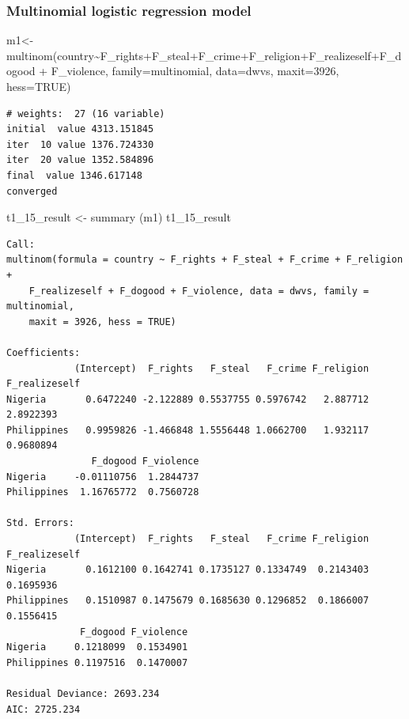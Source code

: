 \documentclass[
  11pt,
]{article}
\newenvironment{Shaded}{\begin{snugshade}}{\end{snugshade}}
\newcommand{\AttributeTok}[1]{\textcolor[rgb]{0.77,0.63,0.00}{#1}}
\newcommand{\ConstantTok}[1]{\textcolor[rgb]{0.00,0.00,0.00}{#1}}
\newcommand{\DecValTok}[1]{\textcolor[rgb]{0.00,0.00,0.81}{#1}}
\newcommand{\FunctionTok}[1]{\textcolor[rgb]{0.00,0.00,0.00}{#1}}
\newcommand{\NormalTok}[1]{#1}
\newcommand{\OtherTok}[1]{\textcolor[rgb]{0.56,0.35,0.01}{#1}}
\newcommand{\SpecialCharTok}[1]{\textcolor[rgb]{0.00,0.00,0.00}{#1}}
\begin{document}
\hypertarget{multinomial-logistic-regression-model}{%
\subsubsection{Multinomial logistic regression model}\label{multinomial-logistic-regression-model}}

\begin{Shaded}
\begin{Highlighting}[]
\NormalTok{m1}\OtherTok{\textless{}{-}} \FunctionTok{multinom}\NormalTok{(country}\SpecialCharTok{\textasciitilde{}}\NormalTok{F\_rights}\SpecialCharTok{+}\NormalTok{F\_steal}\SpecialCharTok{+}\NormalTok{F\_crime}\SpecialCharTok{+}\NormalTok{F\_religion}\SpecialCharTok{+}\NormalTok{F\_realizeself}\SpecialCharTok{+}\NormalTok{F\_dogood }\SpecialCharTok{+}
\NormalTok{                F\_violence, }\AttributeTok{family=}\NormalTok{multinomial, }\AttributeTok{data=}\NormalTok{dwvs, }\AttributeTok{maxit=}\DecValTok{3926}\NormalTok{, }\AttributeTok{hess=}\ConstantTok{TRUE}\NormalTok{)}
\end{Highlighting}
\end{Shaded}

\begin{verbatim}
# weights:  27 (16 variable)
initial  value 4313.151845 
iter  10 value 1376.724330
iter  20 value 1352.584896
final  value 1346.617148 
converged
\end{verbatim}

\begin{Shaded}
\begin{Highlighting}[]
\NormalTok{t1\_15\_result }\OtherTok{\textless{}{-}} \FunctionTok{summary}\NormalTok{ (m1)}
\NormalTok{t1\_15\_result}
\end{Highlighting}
\end{Shaded}

\begin{verbatim}
Call:
multinom(formula = country ~ F_rights + F_steal + F_crime + F_religion + 
    F_realizeself + F_dogood + F_violence, data = dwvs, family = multinomial, 
    maxit = 3926, hess = TRUE)

Coefficients:
            (Intercept)  F_rights   F_steal   F_crime F_religion F_realizeself
Nigeria       0.6472240 -2.122889 0.5537755 0.5976742   2.887712     2.8922393
Philippines   0.9959826 -1.466848 1.5556448 1.0662700   1.932117     0.9680894
               F_dogood F_violence
Nigeria     -0.01110756  1.2844737
Philippines  1.16765772  0.7560728

Std. Errors:
            (Intercept)  F_rights   F_steal   F_crime F_religion F_realizeself
Nigeria       0.1612100 0.1642741 0.1735127 0.1334749  0.2143403     0.1695936
Philippines   0.1510987 0.1475679 0.1685630 0.1296852  0.1866007     0.1556415
             F_dogood F_violence
Nigeria     0.1218099  0.1534901
Philippines 0.1197516  0.1470007

Residual Deviance: 2693.234 
AIC: 2725.234 
\end{verbatim}
\end{document}
